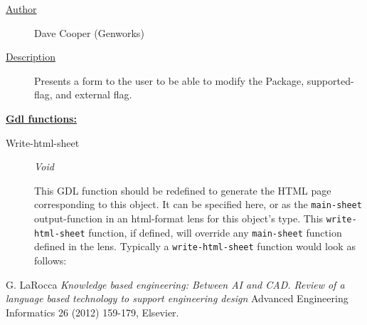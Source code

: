 \documentclass [11pt]{book}
\begin{document}
\begin{itemize}
\begin{description}

\item [
\underline{Author}]


Dave Cooper (Genworks)



\item [
\underline{Description}]


Presents a form to the user to be able to modify the Package, 
supported-flag, and external flag.



\end{description}








\textbf{
\underline{Gdl functions:}}

\begin{description}

\item [Write-html-sheet]
\emph{Void}

 This GDL function should be redefined to generate the HTML page corresponding to this object.
It can be specified here, or as the \texttt{main-sheet} output-function in an html-format lens for this
object's type. This \texttt{write-html-sheet} function, if defined,  will override any \texttt{main-sheet}
function defined in the lens. Typically a \texttt{write-html-sheet} function would look as follows:




\end{description}







\end{itemize}





\backmatter

\begin{thebibliography}{1}

 G. LaRocca \emph{Knowledge based engineering: Between AI
and CAD. Review of a language based technology to support engineering design} 
Advanced Engineering Informatics 26 (2012) 159-179, Elsevier.

\end{thebibliography}


\printindex
\end{document}
